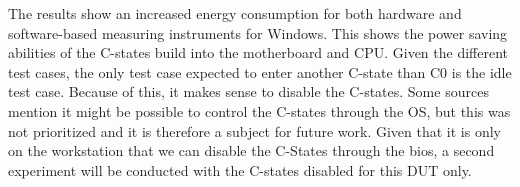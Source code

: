 

The results show an increased energy consumption for both hardware and software-based measuring instruments for Windows. This shows the power saving abilities of the C-states build into the motherboard and CPU. Given the different test cases, the only test case expected to enter another C-state than C0 is the idle test case. Because of this, it makes sense to disable the C-states. Some sources mention it might be possible to control the C-states through the OS\cite{CMete,CLinux}, but this was not prioritized and it is therefore a subject for future work. Given that it is only on the workstation that we can disable the C-States through the bios, a second experiment will be conducted with the C-states disabled for this DUT only.
